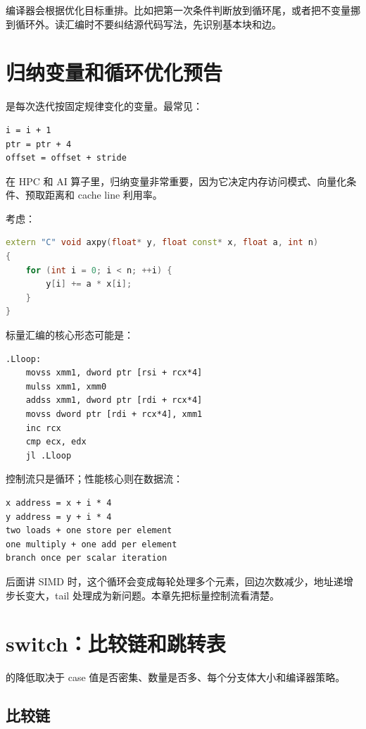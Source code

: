 编译器会根据优化目标重排。比如把第一次条件判断放到循环尾，或者把不变量挪到循环外。读汇编时不要纠结源代码写法，先识别基本块和边。

\section{归纳变量和循环优化预告}

 是每次迭代按固定规律变化的变量。最常见：

\begin{lstlisting}
i = i + 1
ptr = ptr + 4
offset = offset + stride
\end{lstlisting}

在 HPC 和 AI 算子里，归纳变量非常重要，因为它决定内存访问模式、向量化条件、预取距离和 cache line 利用率。

考虑：

\begin{lstlisting}[language=C++]
extern "C" void axpy(float* y, float const* x, float a, int n)
{
    for (int i = 0; i < n; ++i) {
        y[i] += a * x[i];
    }
}
\end{lstlisting}

标量汇编的核心形态可能是：

\begin{lstlisting}
.Lloop:
    movss xmm1, dword ptr [rsi + rcx*4]
    mulss xmm1, xmm0
    addss xmm1, dword ptr [rdi + rcx*4]
    movss dword ptr [rdi + rcx*4], xmm1
    inc rcx
    cmp ecx, edx
    jl .Lloop
\end{lstlisting}

控制流只是循环；性能核心则在数据流：

\begin{lstlisting}
x address = x + i * 4
y address = y + i * 4
two loads + one store per element
one multiply + one add per element
branch once per scalar iteration
\end{lstlisting}

后面讲 SIMD 时，这个循环会变成每轮处理多个元素，回边次数减少，地址递增步长变大，tail 处理成为新问题。本章先把标量控制流看清楚。

\section{switch：比较链和跳转表}

 的降低取决于 case 值是否密集、数量是否多、每个分支体大小和编译器策略。

\subsection{比较链}

